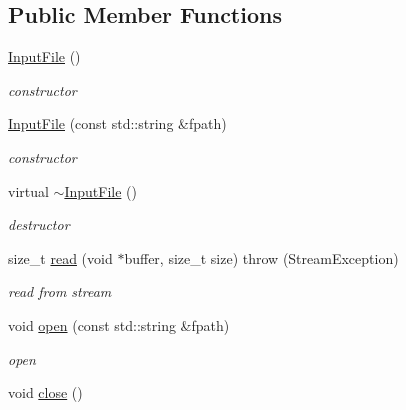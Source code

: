 \subsection*{\-Public \-Member \-Functions}
\begin{DoxyCompactItemize}
\item 
\hypertarget{classsinsy_1_1InputFile_a639375676099652952b522f0e3fd3a0d}{\hyperlink{classsinsy_1_1InputFile_a639375676099652952b522f0e3fd3a0d}{\-Input\-File} ()}\label{classsinsy_1_1InputFile_a639375676099652952b522f0e3fd3a0d}

\begin{DoxyCompactList}\small\item\em constructor \end{DoxyCompactList}\item 
\hypertarget{classsinsy_1_1InputFile_a5475344d19ebba6cae31a8695ac402a5}{\hyperlink{classsinsy_1_1InputFile_a5475344d19ebba6cae31a8695ac402a5}{\-Input\-File} (const std\-::string \&fpath)}\label{classsinsy_1_1InputFile_a5475344d19ebba6cae31a8695ac402a5}

\begin{DoxyCompactList}\small\item\em constructor \end{DoxyCompactList}\item 
\hypertarget{classsinsy_1_1InputFile_a184a592debf38e724f5c709e0b8b4eac}{virtual \hyperlink{classsinsy_1_1InputFile_a184a592debf38e724f5c709e0b8b4eac}{$\sim$\-Input\-File} ()}\label{classsinsy_1_1InputFile_a184a592debf38e724f5c709e0b8b4eac}

\begin{DoxyCompactList}\small\item\em destructor \end{DoxyCompactList}\item 
size\-\_\-t \hyperlink{classsinsy_1_1InputFile_a034391207b94b6b99d8c4a0c0d6f2f44}{read} (void $\ast$buffer, size\-\_\-t size)  throw (\-Stream\-Exception)
\begin{DoxyCompactList}\small\item\em read from stream \end{DoxyCompactList}\item 
\hypertarget{classsinsy_1_1InputFile_a64c7e6611d1bfd3f629e4318863345a3}{void \hyperlink{classsinsy_1_1InputFile_a64c7e6611d1bfd3f629e4318863345a3}{open} (const std\-::string \&fpath)}\label{classsinsy_1_1InputFile_a64c7e6611d1bfd3f629e4318863345a3}

\begin{DoxyCompactList}\small\item\em open \end{DoxyCompactList}\item 
\hypertarget{classsinsy_1_1InputFile_a5d1491bcfa54c25433617b42f1bba866}{void \hyperlink{classsinsy_1_1InputFile_a5d1491bcfa54c25433617b42f1bba866}{close} ()}\label{classsinsy_1_1InputFile_a5d1491bcfa54c25433617b42f1bba866}


\end{DoxyCompactItemize}
